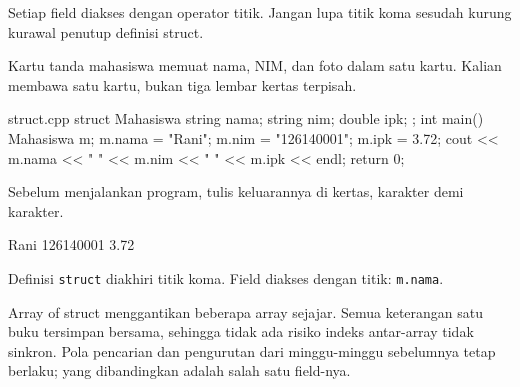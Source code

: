 \documentclass[a4paper]{article}
\begin{document}
Setiap field diakses dengan operator titik. Jangan lupa titik koma sesudah kurung kurawal penutup definisi struct.

\begin{Contoh}
Kartu tanda mahasiswa memuat nama, NIM, dan foto dalam satu kartu. Kalian membawa satu kartu, bukan tiga lembar kertas terpisah.
\end{Contoh}
\begin{MKode}{struct.cpp}
struct Mahasiswa {
    string nama;
    string nim;
    double ipk;
};
int main() {
    Mahasiswa m;
    m.nama = "Rani";
    m.nim = "126140001";
    m.ipk = 3.72;
    cout << m.nama << " " << m.nim << " " << m.ipk << endl;
    return 0;
}
\end{MKode}
\begin{Tebak}[]
Sebelum menjalankan program, tulis keluarannya di kertas, karakter demi karakter.
\end{Tebak}
\begin{Jawaban}[]
\begin{MKeluaran}[]
Rani 126140001 3.72
\end{MKeluaran}
Definisi \texttt{struct} diakhiri titik koma. Field diakses dengan titik: \texttt{m.nama}.
\end{Jawaban}
Array of struct menggantikan beberapa array sejajar. Semua keterangan satu buku tersimpan bersama, sehingga tidak ada risiko indeks antar-array tidak sinkron. Pola pencarian dan pengurutan dari minggu-minggu sebelumnya tetap berlaku; yang dibandingkan adalah salah satu field-nya.
\end{document}
